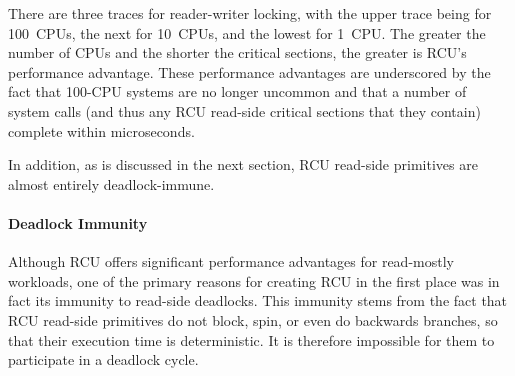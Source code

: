 \QuickQuizEnd

There are three traces for reader-writer locking, with the upper trace
being for 100~CPUs, the next for 10~CPUs, and the lowest for 1~CPU\@.
The greater the number of CPUs and the shorter the critical sections,
the greater is RCU's performance advantage.
These performance advantages are underscored by the fact that 100-CPU
systems are no longer uncommon and that a number of system calls (and
thus any RCU read-side critical sections that they contain) complete
within microseconds.

In addition, as is discussed in the next section,
RCU read-side primitives are almost entirely deadlock-immune.


\paragraph{Deadlock Immunity}

Although RCU offers significant performance advantages for
read-mostly workloads, one of the primary reasons for creating
RCU in the first place was in fact its immunity to read-side
deadlocks.
This immunity stems from the fact that
RCU read-side primitives do not block, spin, or even
do backwards branches, so that their execution time is deterministic.
It is therefore impossible for them to participate in a deadlock
cycle.

